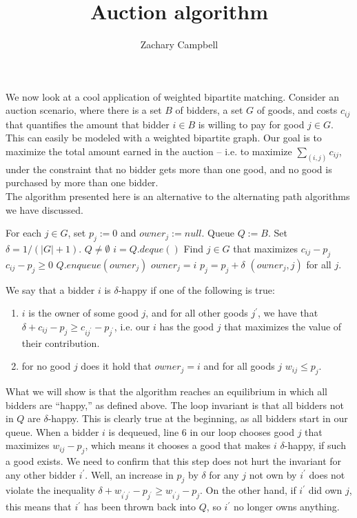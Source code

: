 \documentclass[11pt]{article}
\renewcommand{\'}{^{'}}
\renewcommand{\gets}{:=}
\newenvironment{definition}[2][Definition]{\begin{trivlist}
\item[\hskip \labelsep {\bfseries #1}\hskip \labelsep {\bfseries #2.}]}{\end{trivlist}}
\begin{document}
\title{Auction algorithm}
\author{Zachary Campbell}

\maketitle
\doublespacing
We now look at a cool application of weighted bipartite matching. Consider an auction scenario, where 
there is a set $B$ of bidders, a set $G$ of goods, and costs $c_{ij}$ that quantifies the amount 
that bidder $i\in B$ is willing to pay for good $j\in G$. This can easily be modeled with a 
weighted bipartite graph. Our goal is to maximize the total amount earned in the auction -- i.e. to 
maximize $\sum_{(i,j)} c_{ij}$, under the constraint that no bidder gets more than one good, and no 
good is purchased by more than one bidder. \\
The algorithm presented here is an alternative to the alternating path algorithms we have discussed. 
\singlespace
\begin{codebox}
	\li For each $j\in G$, set $p_j \gets 0$ and $owner_j \gets null$.
	\li Queue $Q \gets B$.
	\li Set $\delta = 1/(|G| + 1)$.
	\li \While $Q\neq \emptyset$
		\Do
	\li		$i = Q.deque()$
	\li		Find $j\in G$ that maximizes $c_{ij} - p_{j}$
	\li		\If $c_{ij} - p_{j} \geq 0$
				\Then
	\li				$Q.enqueue(owner_j)$
	\li				$owner_j = i$
	\li				$p_j = p_j + \delta$
				\End
		\End
	\li \Return $(owner_j,j)$ for all $j$.
\end{codebox}
\doublespacing
\begin{definition}{}
	We say that a bidder $i$ is $\delta$-happy if one of the following is true:
	\begin{enumerate}
		\item $i$ is the owner of some good $j$, and for all other goods $j\'$, we have that 
			$\delta + c_{ij} - p_j \geq c_{ij\'} - p_{j\'}$, i.e. our $i$ has the good $j$ 
			that maximizes the value of their contribution.
		\item for no good $j$ does it hold that $owner_j = i$ and for all goods $j$ 
			$w_{ij} \leq p_j$.
	\end{enumerate}
\end{definition}

What we will show is that the algorithm reaches an equilibrium in which all bidders are ``happy,'' as 
defined above. The loop invariant is that all bidders not in $Q$ are $\delta$-happy. This is 
clearly true at the beginning, as all bidders start in our queue. When a bidder $i$ is dequeued, 
line $6$ in our loop chooses good $j$ that maximizes $w_{ij} - p_j$, which means it chooses a good 
that makes $i$ $\delta$-happy, if such a good exists. We need to confirm that this step does not 
hurt the invariant for any other bidder $i\'$. Well, an increase in $p_j$ by $\delta$ for any $j$ 
not own by $i\'$ does not violate the inequality $\delta + w_{i\' j\'} - p_{j\'} \geq w_{i\' j} - p_j$. 
On the other hand, if $i\'$ did own $j$, this means that $i\'$ has been thrown back into $Q$, so $i\'$ 
no longer owns anything.
\end{document}
